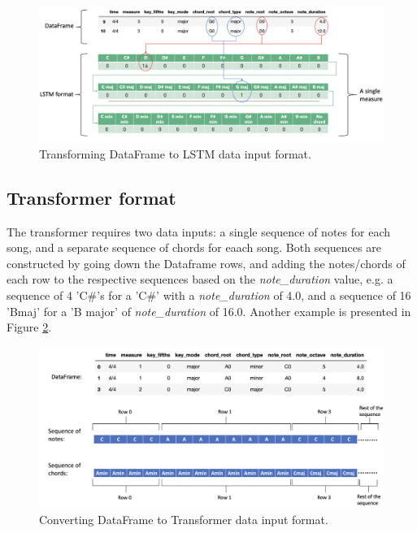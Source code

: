 \begin{figure}
    \centering
    \includegraphics[scale=0.3]{Figures/LSTM pictorial 4}
    \decoRule
    \caption{Transforming DataFrame to LSTM data input format.}
    \label{fig:LSTM}
    \end{figure}
    


\subsection{Transformer format}
The transformer requires two data inputs: a single sequence of notes for each song, and a separate sequence of chords for eaach song. Both sequences are constructed by going down the Dataframe rows, and adding the notes/chords of each row to the respective sequences based on the \emph{note\_duration} value, e.g. a sequence of 4 'C\#'s for a 'C\#' with a \emph{note\_duration} of 4.0, and a sequence of 16 'Bmaj' for a 'B major' of \emph{note\_duration} of 16.0. Another example is presented in Figure \ref{fig:Transformer}.


\begin{figure}
    \centering
    \includegraphics[scale=0.3]{Figures/Transformer 2}
    \decoRule
    \caption{Converting DataFrame to Transformer data input format.}
    \label{fig:Transformer}
    \end{figure}
    
